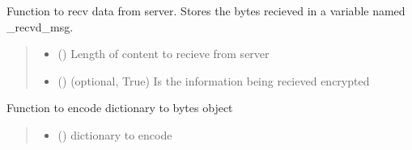 \documentclass[letterpaper,10pt,english]{sphinxmanual}
\begin{document}
\begin{fulllineitems}
\begin{fulllineitems}
\label{\detokenize{Message:Message.Message._recv_data_from_server}}
\pysigstartsignatures
{}
\pysigstopsignatures
\sphinxAtStartPar
Function to recv data from server. Stores the bytes recieved in a variable named \_recvd\_msg.
\begin{quote}\begin{description}
\begin{itemize}
\item {} 
\sphinxAtStartPar
{} () \textendash{} Length of content to recieve from server

\item {} 
\sphinxAtStartPar
{} () \textendash{} (optional, True) Is the information being recieved encrypted

\end{itemize}

\end{description}\end{quote}

\end{fulllineitems}


\begin{fulllineitems}
\label{\detokenize{Message:Message.Message._json_encode}}
\pysigstartsignatures
{}
\pysigstopsignatures
\sphinxAtStartPar
Function to encode dictionary to bytes object
\begin{quote}\begin{description}
\begin{itemize}
\item {} 
\sphinxAtStartPar
{} () \textendash{} dictionary to encode


\end{itemize}
\end{description}
\end{quote}
\end{fulllineitems}
\end{fulllineitems}
\end{document}
